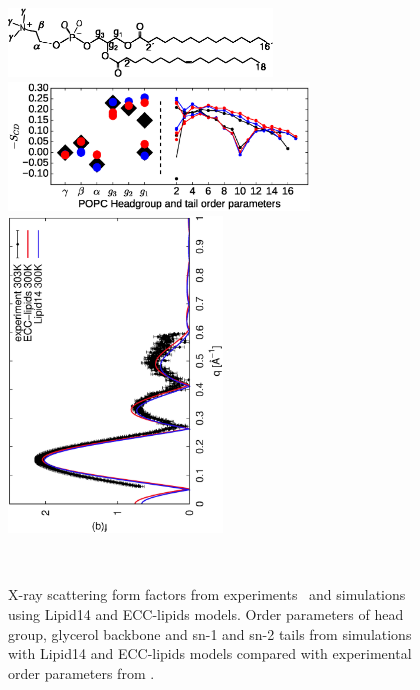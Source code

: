 \documentclass[aip,jcp,twocolumn]{revtex4}
\begin{document}
\begin{figure}[tbp]
  \centering
  \includegraphics[width=7.0cm]{../Fig/POPCstructure.eps}
  \includegraphics[width=8.0cm]{../Fig/ipython_nb/Order-parameters_exp-L14-ECCL17_q80_sig89.eps}
  \includegraphics[height=8.4cm,angle=-90]{../Fig/form-f_exp-l14-eccl17.eps}
  \caption{\label{simVSexpNOions}
    X-ray scattering form factors from experiments~\cite{Kucerka2011} and simulations using Lipid14 \cite{dickson14} and ECC-lipids models. 
    Order parameters of head group, glycerol backbone and sn-1 and sn-2 tails  from simulations with Lipid14 \cite{dickson14} and ECC-lipids models
    compared with experimental order parameters from \cite{ferreira13}.}
   \\
\end{figure}
\end{document}
